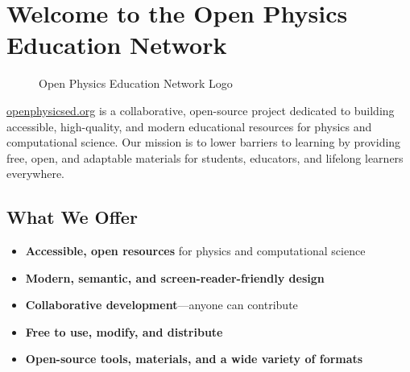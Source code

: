 \section{Welcome to the Open Physics Education
Network}\label{welcome-to-the-open-physics-education-network}

\begin{figure}
\centering
{}
\caption{Open Physics Education Network Logo}
\end{figure}

\href{https://open-physics-ed-org.github.io/}{openphysicsed.org} is a
collaborative, open-source project dedicated to building accessible,
high-quality, and modern educational resources for physics and
computational science. Our mission is to lower barriers to learning by
providing free, open, and adaptable materials for students, educators,
and lifelong learners everywhere.

\subsection{What We Offer}\label{what-we-offer}

\begin{itemize}
\tightlist
\item
  \textbf{Accessible, open resources} for physics and computational
  science
\item
  \textbf{Modern, semantic, and screen-reader-friendly design}
\item
  \textbf{Collaborative development}---anyone can contribute
\item
  \textbf{Free to use, modify, and distribute}
\item
  \textbf{Open-source tools, materials, and a wide variety of formats}
\end{itemize}


